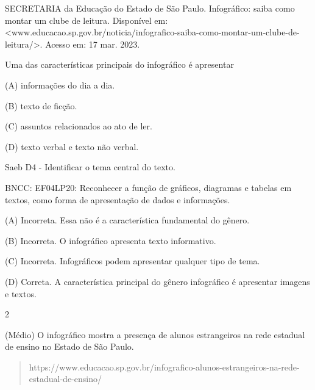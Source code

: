 \begin{escolha}
\begin{escolha}
{SECRETARIA da Educação do Estado de São Paulo. Infográfico: saiba como
montar um clube de leitura. Disponível em:
\textless{}www.educacao.sp.gov.br/noticia/infografico-saiba-como-montar-um-clube-de-leitura/\textgreater{}.
Acesso em: 17 mar. 2023.

Uma das características principais do infográfico é apresentar

(A) informações do dia a dia.

(B) texto de ficção.

(C) assuntos relacionados ao ato de ler.

(D) texto verbal e texto não verbal.

Saeb D4 - Identificar o tema central do texto.

BNCC: EF04LP20: Reconhecer a função de gráficos, diagramas e tabelas em
textos, como forma de apresentação de dados e informações.

(A) Incorreta. Essa não é a característica fundamental do gênero.

(B) Incorreta. O infográfico apresenta texto informativo.

(C) Incorreta. Infográficos podem apresentar qualquer tipo de tema.

(D) Correta. A característica principal do gênero infográfico é
apresentar imagens e textos.

\num{2}

(Médio) O infográfico mostra a presença de alunos estrangeiros na rede
estadual de ensino no Estado de São Paulo.

\begin{quote}
https://www.educacao.sp.gov.br/infografico-alunos-estrangeiros-na-rede-estadual-de-ensino/


\end{quote}}
\end{escolha}
\end{escolha}
